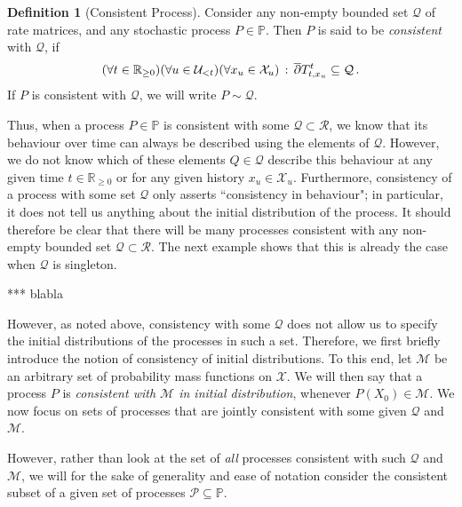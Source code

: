 \documentclass[10pt,a4paper]{paper}
\theoremstyle{definition}
\newtheorem{definition}{Definition}
\newcommand{\reals}{\mathbb{R}}
\newcommand{\realsnonneg}{\reals_{\geq 0}}
\newcommand{\states}{\mathcal{X}}
\newcommand{\processes}{\mathbb{P}}
\newcommand{\rateset}{\mathcal{Q}}
\begin{document}
\begin{definition}[Consistent Process]\label{def:consistent_process}
Consider any non-empty bounded set $\rateset$ of rate matrices, and any stochastic process $P\in\processes$. Then $P$ is said to be \emph{consistent} with $\rateset$, if
\begin{equation*}
(\forall t\in\realsnonneg)(\forall u\in\mathcal{U}_{<t})(\forall x_u\in\states_u)\,:\, \smash{\overline{\partial}}T_{t,x_u}^t \subseteq \rateset\,.
\end{equation*}
If $P$ is consistent with $\rateset$, we will write $P\sim\rateset$.
\end{definition}

Thus, when a process $P\in\processes$ is consistent with some $\rateset\subset\mathcal{R}$, we know that its behaviour over time can always be described using the elements of $\rateset$. However, we do not know which of these elements $Q\in\rateset$ describe this behaviour at any given time  $t\in\realsnonneg$ or for any given history $x_u\in\states_u$. Furthermore, consistency of a process with some set $\rateset$ only asserts ``consistency in behaviour"; in particular, it does not tell us anything about the initial distribution of the process. It should therefore be clear that there will be many processes consistent with any non-empty bounded set $\rateset\subset\mathcal{R}$. The next example shows that this is already the case when $\rateset$ is singleton.

*** blabla

However, as noted above, consistency with some $\rateset$ does not allow us to specify the initial distributions of the processes in such a set. Therefore, we first briefly introduce the notion of consistency of initial distributions. To this end, let $\mathcal{M}$ be an arbitrary set of probability mass functions on $\states$. We will then say that a process $P$ is \emph{consistent with $\mathcal{M}$ in initial distribution}, whenever $P(X_0)\in\mathcal{M}$. We now focus on sets of processes that are jointly consistent with some given $\rateset$ and $\mathcal{M}$.

However, rather than look at the set of \emph{all} processes consistent with such $\rateset$ and $\mathcal{M}$, we will for the sake of generality and ease of notation consider the consistent subset of a given set of processes $\mathcal{P}\subseteq\processes$.

\end{document}
